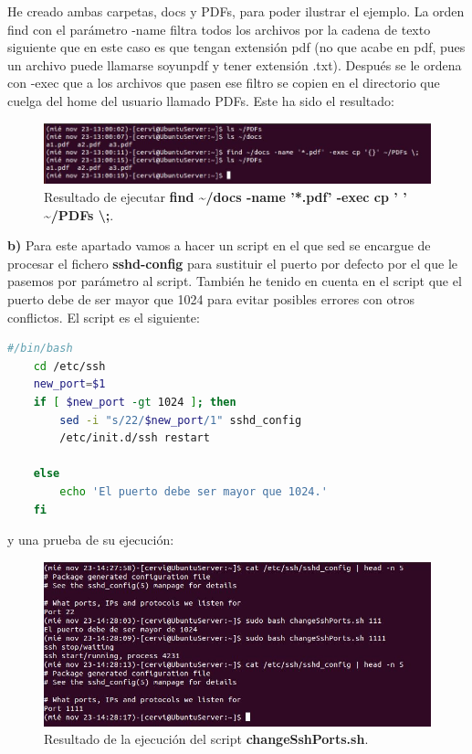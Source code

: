He creado ambas carpetas, docs y PDFs, para poder ilustrar el ejemplo. La orden find\cite{find} con el parámetro -name filtra todos los archivos por la cadena de texto siguiente que en este caso es que tengan extensión pdf (no que acabe en pdf, pues un archivo puede llamarse soyunpdf y tener extensión .txt). Después se le ordena con -exec que a los archivos que pasen ese filtro se copien en el directorio que cuelga del home del usuario llamado PDFs. Este ha sido el resultado:
\begin{figure}[H]
	\centering
	\includegraphics[scale=0.7]{find-pdfs.jpg}
	\caption{Resultado de ejecutar \textbf{find \textasciitilde/docs -name '*.pdf' -exec cp ' \textbraceleft \textbraceright ' \textasciitilde/PDFs \textbackslash;}. \label{fig:figura23}}
\end{figure}

\textbf{b)} Para este apartado vamos a hacer un script en el que sed\cite{sed} se encargue de procesar el fichero \textbf{sshd-config} para sustituir el puerto por defecto por el que le pasemos por parámetro al script. También he tenido en cuenta en el script que el puerto debe de ser mayor que 1024 para evitar posibles errores con otros conflictos. El script es el siguiente:
\begin{lstlisting}[language=bash,caption={sed script}]
	#/bin/bash
	cd /etc/ssh
	new_port=$1
	if [ $new_port -gt 1024 ]; then
		sed -i "s/22/$new_port/1" sshd_config
		/etc/init.d/ssh restart

	else
		echo 'El puerto debe ser mayor que 1024.'
	fi
\end{lstlisting}
\vspace{9mm}
y una prueba de su ejecución:
\begin{figure}[H]
	\centering
	\includegraphics[scale=0.75]{sed-script.jpg}
	\caption{Resultado de la ejecución del script \textbf{changeSshPorts.sh}. \label{fig:figura24}}
\end{figure}

